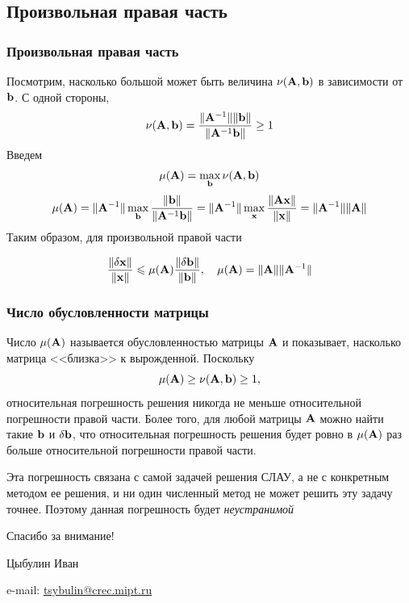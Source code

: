 \documentclass[apectratio=43,unicode]{beamer}
\newcommand{\colorhref}[2]{\href{#1}{\textcolor{miptbase!30!black}{#2}}}
\begin{document}
\subsection{Произвольная правая часть}
\begin{frame}
\frametitle{Произвольная правая часть}
	Посмотрим, насколько большой может быть величина $\nu({\mathbf{A}},{\mathbf{b}})$ в зависимости от ${\mathbf{b}}$. С одной стороны,
	$$
	\nu({\mathbf{A}},{\mathbf{b}}) = \frac{\|{\mathbf{A}}^{-1}\|\|{\mathbf{b}}\|}{\|{\mathbf{A}}^{-1}{\mathbf{b}}\|} \geq 1
	$$
	Введем
	$$
	\mu({\mathbf{A}}) = \max_{{\mathbf{b}}} \nu({\mathbf{A}}, {\mathbf{b}})
	$$
	$$
	\mu({\mathbf{A}}) = \|{\mathbf{A}}^{-1}\|\max_{{\mathbf{b}}} \frac{\|{\mathbf{b}}\|}{\|{\mathbf{A}}^{-1}{\mathbf{b}}\|} = \|{\mathbf{A}}^{-1}\|\max_{{\mathbf{x}}} \frac{\|{\mathbf{A}}{\mathbf{x}}\|}{\|{\mathbf{x}}\|} = \|{\mathbf{A}}^{-1}\| \|{\mathbf{A}}\|
	$$
	Таким образом, для произвольной правой части
	\begin{block}{}
	$$\frac{\|\delta{\mathbf{x}}\|}{\|{\mathbf{x}}\|} \leqslant \mu({\mathbf{A}}) \frac{\|\delta {\mathbf{b}}\|}{\|{\mathbf{b}}\|}, \quad \mu({\mathbf{A}}) = \|{\mathbf{A}}\|\|{\mathbf{A}}^{-1}\|$$
	\end{block}
\end{frame}

\begin{frame}
\frametitle{Число обусловленности матрицы}
	Число $\mu({\mathbf{A}})$ называется обусловленностью матрицы ${\mathbf{A}}$ и показывает,
	насколько матрица <<близка>> к вырожденной. Поскольку
	$$
	\mu({\mathbf{A}}) \geq \nu({\mathbf{A}},{\mathbf{b}}) \geq 1,
	$$
	относительная погрешность решения никогда не меньше относительной погрешности правой части. Более того, для любой матрицы ${\mathbf{A}}$
	можно найти такие ${\mathbf{b}}$ и $\delta {\mathbf{b}}$, что относительная погрешность решения будет ровно в $\mu({\mathbf{A}})$ раз больше относительной
	погрешности правой части.

	Эта погрешность связана с самой задачей решения СЛАУ, а не с конкретным методом ее решения, и ни один численный метод
	не может решить эту задачу точнее. Поэтому данная погрешность будет \emph{неустранимой}
\end{frame}

\begin{frame}[plain]
  \begin{center}
  {\Huge Спасибо за внимание!}
  \vspace{8ex}

  Цыбулин Иван

  e-mail: \colorhref{mailto:tsybulin@crec.mipt.ru}{tsybulin@crec.mipt.ru}
  \end{center}
\end{frame}
\end{document}
